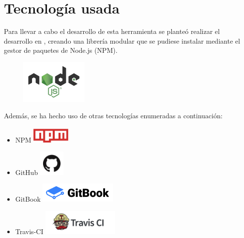 \section{Tecnología usada}
\label{1:sec:3}
 
Para llevar a cabo el desarrollo de esta herramienta se planteó realizar el desarrollo en , creando una librería modular que se pudiese instalar mediante el gestor de paquetes de Node.js (NPM).

\begin{figure}[H]
\begin{center}
\includegraphics[width=0.3\textwidth]{images/nodejs-logo}
\end{center}
\end{figure}

Además, se ha hecho uso de otras tecnologías enumeradas a continuación:
\begin{itemize}
  \item NPM            \includegraphics[width=0.15\textwidth]{images/npm}
  \item GitHub         \includegraphics[width=0.1\textwidth]{images/github}
  \item GitBook        \includegraphics[width=0.3\textwidth]{images/gitbook}
  \item Travis-CI      \includegraphics[width=0.3\textwidth]{images/travis-ci-logo}
\end{itemize}
